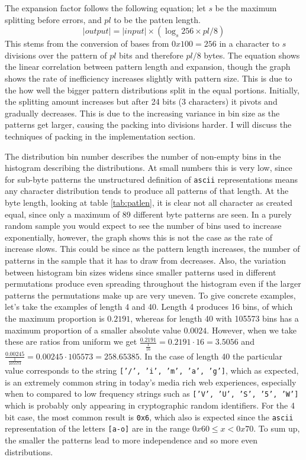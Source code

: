\documentclass[10pt,a4paper]{article}
\begin{document}
The expansion factor follows the following equation; let $s$ be the maximum splitting before errors, and $pl$ to be the patten length.
$$|output| = |input| \times \left( \log_s 256 \times pl / 8 \right)$$ 
This stems from the conversion of bases from $0x100=256$ in a character to $s$ divisions over the pattern of $pl$ bits and therefore $pl/8$ bytes. The equation shows the linear correlation between pattern length and expansion, though the graph shows the rate of inefficiency increases slightly with pattern size. This is due to the how well the bigger pattern distributions split in the equal portions. Initially, the splitting amount increases but after 24 bits (3 characters) it pivots and gradually decreases.  This is due to the increasing variance in bin size as the patterns get larger, causing the packing into divisions harder. I will discuss the techniques of packing in the implementation section. 

The distribution bin number describes the number of non-empty bins in the histogram describing the distributions.
At small numbers this is very low, since for sub-byte patterns the unstructured definition of \texttt{ascii} representations means any character distribution tends to produce all patterns of that length.
At the byte length, looking at table \ref{tab:patlen}, it is clear not all character as created equal, since only a maximum of 89 different byte patterns are seen.
In a purely random sample you would expect to see the number of bins used to increase exponentially, however, the graph shows this is not the case as the rate of increase slows.
This could be since as the pattern length increases, the number of patterns in the sample that it has to draw from decreases.
Also, the variation between histogram bin sizes widens since smaller patterns used in different permutations produce even spreading throughout the histogram even if the larger patterns the permutations make up are very uneven.
To give concrete examples, let's take the examples of length 4 and 40.
Length 4 produces 16 bins, of which the maximum proportion is $0.2191$, whereas for length 40 with 105573 bins has a maximum proportion of a smaller absolute value $0.0024$.
However, when we take these are ratios from uniform we get $\frac{0.2191}{\frac{1}{16}} = 0.2191 \cdot 16 = 3.5056$ and $\frac{0.00245}{\frac{1}{105573}} = 0.00245 \cdot 105573 = 258.65385$.
In the case of length 40 the particular value corresponds to the string \texttt{['/', 'i', 'm', 'a', 'g']}, which as expected, is an extremely common string in today's media rich web experiences, especially when to compared to low frequency strings such as \texttt{['V', 'U', 'S', '5', 'W']} which is probably only appearing in cryptographic random identifiers.
For the 4 bit case, the most common result is \texttt{0x6}, which also is expected since the \texttt{ascii} representation of the letters \texttt{[a-o]} are in the range $0x60 \leq x < 0x70$.
To sum up, the smaller the patterns lead to more independence and so more even distributions. 
\end{document}
